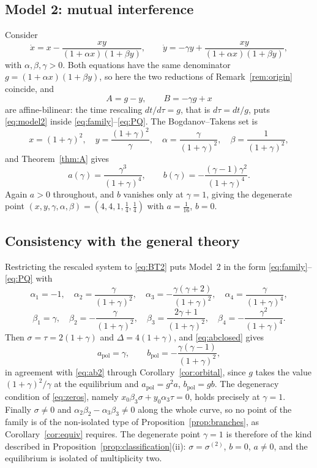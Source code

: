 \documentclass[12pt]{article}
\theoremstyle{plain}
\theoremstyle{definition}
\theoremstyle{remark}
\begin{document}
	\subsection{Model 2: mutual interference}
	
	Consider
	\begin{equation}\label{eq:model2}
		\dot x = x-\frac{xy}{(1+\alpha x)(1+\beta y)},
		\qquad
		\dot y = -\gamma y+\frac{xy}{(1+\alpha x)(1+\beta y)} ,
	\end{equation}
	with $\alpha,\beta,\gamma>0$.  Both equations have the same denominator
	$g=(1+\alpha x)(1+\beta y)$, so here the two reductions of
	Remark~\ref{rem:origin} coincide, and
	\[
	A=g-y,\qquad B=-\gamma g+x
	\]
	are affine-bilinear: the time rescaling $dt/d\tau=g$, that is
	$d\tau=dt/g$, puts \eqref{eq:model2} inside
	\eqref{eq:family}--\eqref{eq:PQ}.  The
	Bogdanov--Takens set is
	\begin{equation}\label{eq:BT2}
		x=(1+\gamma)^{2},\quad
		y=\frac{(1+\gamma)^{2}}{\gamma},\quad
		\alpha=\frac{\gamma}{(1+\gamma)^{2}},\quad
		\beta=\frac{1}{(1+\gamma)^{2}} ,
	\end{equation}
	and Theorem~\ref{thm:A} gives
	\begin{equation}\label{eq:ab2}
		a(\gamma)=\frac{\gamma^{3}}{(1+\gamma)^{4}},
		\qquad
		b(\gamma)=-\frac{(\gamma-1)\gamma^{2}}{(1+\gamma)^{4}} .
	\end{equation}
	Again $a>0$ throughout, and $b$ vanishes only at $\gamma=1$, giving the
	degenerate point $(x,y,\gamma,\alpha,\beta)=(4,4,1,\tfrac14,\tfrac14)$
	with $a=\tfrac1{16}$, $b=0$.
	
	\subsection{Consistency with the general theory}
	
	Restricting the rescaled system to \eqref{eq:BT2} puts Model~2 in the
	form \eqref{eq:family}--\eqref{eq:PQ} with
	\[
	\alpha_{1}=-1,\quad
	\alpha_{2}=\frac{\gamma}{(1+\gamma)^{2}},\quad
	\alpha_{3}=-\frac{\gamma(\gamma+2)}{(1+\gamma)^{2}},\quad
	\alpha_{4}=\frac{\gamma}{(1+\gamma)^{4}},
	\]
	\[
	\beta_{1}=\gamma,\quad
	\beta_{2}=-\frac{\gamma}{(1+\gamma)^{2}},\quad
	\beta_{3}=\frac{2\gamma+1}{(1+\gamma)^{2}},\quad
	\beta_{4}=-\frac{\gamma^{2}}{(1+\gamma)^{4}} .
	\]
	Then $\sigma=\tau=2(1+\gamma)$ and $\Delta=4(1+\gamma)$, and
	\eqref{eq:abclosed} gives
	\[
	a_{\mathrm{pol}}=\gamma,
	\qquad
	b_{\mathrm{pol}}=-\frac{\gamma(\gamma-1)}{(1+\gamma)^{2}} ,
	\]
	in agreement with \eqref{eq:ab2} through
	Corollary~\ref{cor:orbital}, since $g$ takes the value
	$(1+\gamma)^{2}/\gamma$ at the equilibrium and
	$a_{\mathrm{pol}}=g^{2}a$, $b_{\mathrm{pol}}=gb$.  The degeneracy
	condition of \eqref{eq:zeros}, namely
	$x_{0}\beta_{3}\sigma+y_{0}\alpha_{3}\tau=0$, holds precisely at
	$\gamma=1$.  Finally $\sigma\neq0$ and
	$\alpha_{2}\beta_{2}-\alpha_{3}\beta_{3}\neq0$ along the whole curve,
	so no point of the family is of the non-isolated type of
	Proposition~\ref{prop:branches}, as Corollary~\ref{cor:equiv} requires.
	The degenerate point $\gamma=1$ is therefore of the kind described in
	Proposition~\ref{prop:classification}(ii): $\sigma=\sigma^{(2)}$,
	$b=0$, $a\neq0$, and the equilibrium is isolated of multiplicity two.
	
\end{document}
